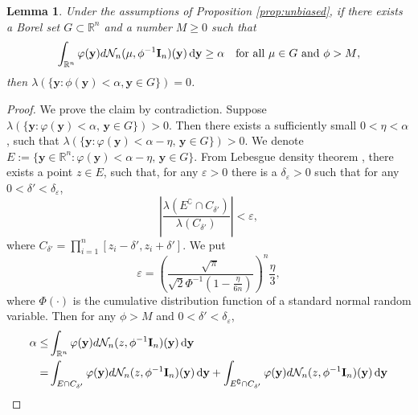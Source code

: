 \documentclass[bj]{imsart}
\newcommand{\By}{\mathbf{y}}    \newcommand{\Bz}{\mathbf{z}}
\theoremstyle{plain}
\newtheorem{lemma}{\quad\quad Lemma}
\theoremstyle{definition}
\theoremstyle{remark}
\begin{document}
\begin{lemma}\label{Lemma:FF}
    Under the assumptions of Proposition \ref{prop:unbiased}, if there exists a Borel set $G\subset \mathbb R^n$ and a number $M\geq 0$ such that 
    \begin{equation*}
        \int_{\mathbb R^n} \varphi(\By) d\mathcal N_n(\mu,\phi^{-1} \BI_n)(\By)\, \mathrm{d} \By \geq \alpha\quad \text{for all $\mu \in G$ and $\phi >M$},
    \end{equation*}
    then $\lambda(\{\By : \phi(\By)< \alpha, \By \in G\})=0$.
\end{lemma}
\begin{proof}
    We prove the claim by contradiction.
    Suppose $\lambda(\{\By:\varphi (\By) <\alpha,\, \By \in G\})>0$.
    Then there exists a sufficiently small $0< \eta <\alpha$, such that $\lambda(\{\By:\varphi (\By) <\alpha-\eta,\, \By \in G\})>0$.
    We denote $ E:=\{\By\in \mathbb R^n:\varphi (\By) <\alpha-\eta,\,  \By \in G\}$.
    From Lebesgue density theorem \citep[Corollary 6.2.6]{book:992991}, there exists a point $z\in  E$, such that, for any $\varepsilon >0$ there is a $\delta_{\varepsilon}>0$ such that for any $0 < \delta' <\delta_\varepsilon$,
    \begin{equation*}
        \left|\frac{\lambda(E^\complement\cap C_{\delta'})}{\lambda(C_{\delta'})}\right|<\varepsilon,
    \end{equation*}
    where $C_{\delta'}=\prod_{i=1}^n [z_i-{\delta'}, z_i + {\delta'}]$.
    We put
    \begin{equation*}
        \varepsilon=\left(\frac{\sqrt \pi}{\sqrt 2 \Phi^{-1}\left(1-\frac{\eta}{6n}\right)}\right)^n \frac{\eta}{3},
    \end{equation*}
    where $\Phi(\cdot)$ is the cumulative distribution function of a standard normal random variable.
    Then for any $\phi>M$ and $0<\delta' <\delta_\varepsilon$,
    \begin{equation*}
        \begin{split}
            \alpha \leq& 
            \int_{\mathbb R^n}\varphi(\By) d\mathcal N_n (z, \phi^{-1} \BI_n) (\By)\,\mathrm{d} \By
            \\
            =&
            \int_{E\cap C_{\delta'}}\varphi(\By) d\mathcal N_n (z, \phi^{-1} \BI_n) (\By)\,\mathrm{d} \By
            +
            \int_{E^\complement\cap C_{\delta'}}\varphi(\By) d\mathcal N_n (z, \phi^{-1} \BI_n) (\By)\,\mathrm{d} \By
            \\

\end{split}
\end{equation*}
\end{proof}
\end{document}

